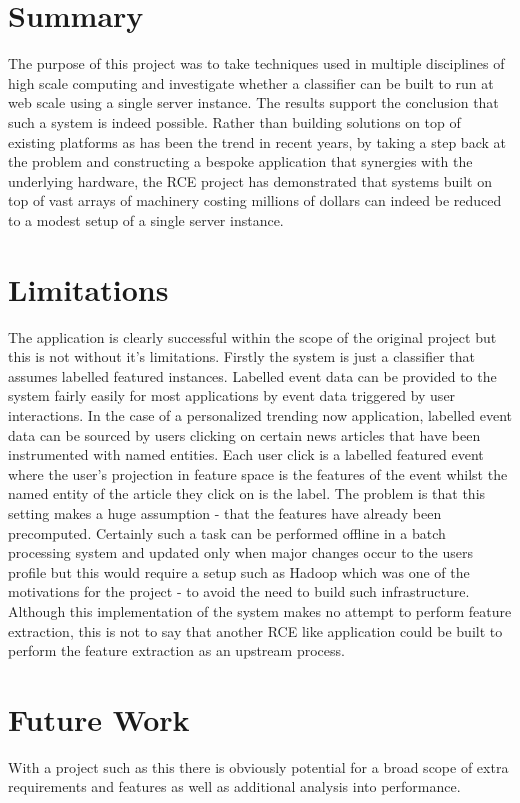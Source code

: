 \documentclass[a4paper,11pt]{scrreprt}
\begin{document}
\section{Summary}
The purpose of this project was to take techniques used in multiple disciplines of high scale computing and investigate whether a classifier can be built to run at web scale using a single server instance. The results support the conclusion that such a system is indeed possible. Rather than building solutions on top of existing platforms as has been the trend in recent years, by taking a step back at the problem and constructing a bespoke application that synergies with the underlying hardware, the RCE project has demonstrated that systems built on top of vast arrays of machinery costing millions of dollars can indeed be reduced to a modest setup of a single server instance. 

\section{Limitations}
The application is clearly successful within the scope of the original project but this is not without it's limitations. Firstly the system is just a classifier that assumes labelled featured instances. Labelled event data can be provided to the system fairly easily for most applications by event data triggered by user interactions. In the case of a personalized trending now application, labelled event data can be sourced by users clicking on certain news articles that have been instrumented with named entities. Each user click is a labelled featured event where the user's projection in feature space is the features of the event whilst the named entity of the article they click on is the label. The problem is that this setting makes a huge assumption - that the features have already been precomputed. Certainly such a task can be performed offline in a batch processing system and updated only when major changes occur to the users profile but this would require a setup such as Hadoop which was one of the motivations for the project - to avoid the need to build such infrastructure. Although this implementation of the system makes no attempt to perform feature extraction, this is not to say that another RCE like application could be built to perform the feature extraction as an upstream process.
\section{Future Work}
With a project such as this there is obviously potential for a broad scope of extra requirements and features as well as additional analysis into performance. 
\end{document}
